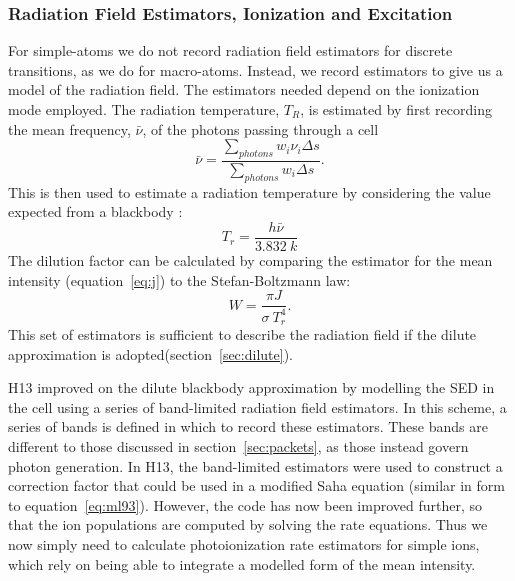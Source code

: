 \subsubsection{Radiation Field Estimators, Ionization and Excitation}
\label{sec:simple_ionization}
For simple-atoms we do not record radiation field estimators for discrete 
transitions, as we do for macro-atoms. Instead, we record estimators to
give us a model of the radiation field. The estimators needed
depend on the ionization mode employed.
The radiation temperature, $T_R$, is estimated by first recording the mean frequency, 
$\bar{\nu}$, of the photons passing through a cell
\begin{equation}
\bar{\nu} = \frac{\sum_{photons} w_i \nu_i \Delta s}{\sum_{photons} w_i \Delta s}.
\end{equation}
This is then used to estimate a radiation temperature by
considering the value expected from a blackbody \citep{ML93}:
\begin{equation}
T_r = \frac{h\bar{\nu}}{3.832~k}
\end{equation}
The dilution factor can be calculated by comparing the estimator for the mean intensity (equation~\ref{eq:j}) to the Stefan-Boltzmann law:
\begin{equation}
W = \frac{\pi J}{\sigma~T_r^4}.
\end{equation}
This set of estimators is sufficient to describe the 
radiation field if the dilute approximation is adopted(section~\ref{sec:dilute}).

H13 improved on the dilute blackbody approximation by
modelling the SED in the cell using a series of band-limited 
radiation field estimators. In this scheme, a series of bands is defined
in which to record these estimators. These bands are different to those
discussed in section~\ref{sec:packets}, as those instead govern photon generation.
In H13, the band-limited estimators were used to construct a correction factor
that could be used in a modified Saha equation 
(similar in form to equation~\ref{eq:ml93}). However, the code has now been
improved further, so that the ion populations are computed by solving the rate equations.
Thus we now simply need to calculate photoionization rate estimators for simple 
ions, which rely on being able to integrate a modelled form of the mean intensity.

